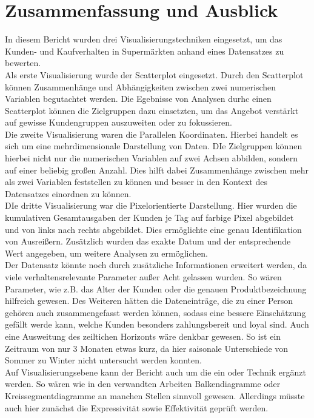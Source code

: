 \documentclass[usegeometry=true]{scrartcl}
\begin{document}
\section{Zusammenfassung und Ausblick}
In diesem Bericht wurden drei Visualisierungstechniken eingesetzt, um das Kunden- und Kaufverhalten in Supermärkten anhand eines Datensatzes zu bewerten.\\
Als erste Visualisierung wurde der Scatterplot eingesetzt. Durch den Scatterplot können Zusammenhänge und Abhängigkeiten zwischen zwei numerischen Variablen begutachtet werden.
Die Egebnisse von Analysen durhc einen Scatterplot können die Zielgruppen dazu einsetzten, um das Angebot verstärkt auf gewisse Kundengruppen auszuweiten oder zu fokussieren.\\
Die zweite Visualisierung waren die Parallelen Koordinaten. Hierbei handelt es sich um eine mehrdimensionale Darstellung von Daten. DIe Zielgruppen können hierbei nicht nur die
numerischen Variablen auf zwei Achsen abbilden, sondern auf einer beliebig großen Anzahl. Dies hilft dabei Zusammenhänge zwischen mehr als zwei Variablen feststellen zu können und
besser in den Kontext des Datensatzes einordnen zu können.\\
DIe dritte Visualisierung war die Pixelorientierte Darstellung. Hier wurden die kumulativen Gesamtausgaben der Kunden je Tag auf farbige Pixel abgebildet und von links nach rechts
abgebildet. Dies ermöglichte eine genau Identifikation von Ausreißern. Zusätzlich wurden das exakte Datum und der entsprechende Wert angegeben, um weitere Analysen zu ermöglichen.\\
\noindent Der Datensatz könnte noch durch zusätzliche Informationen erweitert werden, da viele verhaltensrelevante Parameter außer Acht gelassen wurden. So wären Parameter, wie
z.B. das Alter der Kunden oder die genauen Produktbezeichnung hilfreich gewesen. Des Weiteren hätten die Dateneinträge, die zu einer Person gehören auch zusammengefasst werden
können, sodass eine bessere Einschätzung gefällt werde kann, welche Kunden besonders zahlungsbereit und loyal sind. Auch eine Ausweitung des zeiltichen Horizonts wäre denkbar
gewesen. So ist ein Zeitraum von nur 3 Monaten etwas kurz, da hier saisonale Unterschiede von Sommer zu Winter nicht untersucht werden konnten.\\
Auf Visualisierungsebene kann der Bericht auch um die ein oder Technik ergänzt werden. So wären wie in den verwandten Arbeiten Balkendiagramme oder Kreissegmentdiagramme an manchen
Stellen sinnvoll gewesen. Allerdings müsste auch hier zunächst die Expressivität sowie Effektivität geprüft werden.
\newpage
\printbibliography
\end{document}
